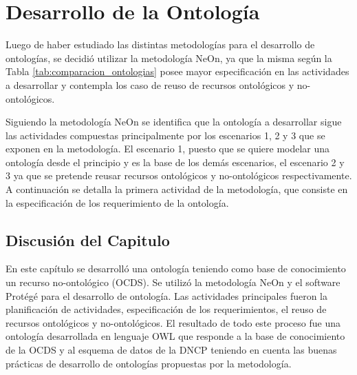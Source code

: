 \chapter{Desarrollo de la Ontología}
\label{chap:Desarrollo de la Ontologia}

Luego de haber estudiado las distintas metodologías para el desarrollo de ontologías, se decidió utilizar la metodología NeOn, ya que la misma según la Tabla  \ref{tab:comparacion_ontologias} posee mayor especificación en las actividades a desarrollar  y contempla los caso de reuso de recursos ontológicos y no-ontológicos. 

Siguiendo la metodología NeOn se identifica que la ontología a desarrollar sigue las actividades compuestas principalmente por los escenarios 1, 2 y 3 que se exponen en la metodología. El escenario 1, puesto que se quiere modelar una ontología desde el principio y es la base de los demás escenarios, el escenario 2 y 3 ya que se pretende reusar recursos ontológicos y no-ontológicos respectivamente. A continuación se detalla la primera actividad de la metodología, que consiste en la especificación de los requerimiento de la ontología.









\section{Discusión del Capitulo}

En este capítulo se desarrolló una ontología teniendo como base de conocimiento un recurso no-ontológico (OCDS). Se utilizó la metodología NeOn y el software Protégé para el desarrollo de ontología. Las actividades principales fueron la planificación de actividades, especificación de los requerimientos, el reuso de recursos ontológicos y no-ontológicos. El resultado de todo este proceso fue una ontología desarrollada en lenguaje OWL que responde a la base de conocimiento de la OCDS y al esquema de datos de la DNCP teniendo en cuenta las buenas prácticas de desarrollo de ontologías propuestas por la metodología.




